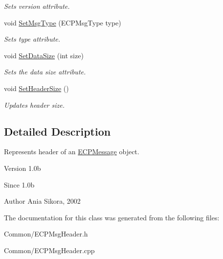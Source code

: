 \begin{DoxyCompactItemize}
\begin{DoxyCompactList}\small\item\em Sets version attribute. \end{DoxyCompactList}\item 
\hypertarget{class_common_1_1_e_c_p_msg_header_a9ac66458c65b4f049f70cae4aefbf6a0}{void \hyperlink{class_common_1_1_e_c_p_msg_header_a9ac66458c65b4f049f70cae4aefbf6a0}{Set\-Msg\-Type} (E\-C\-P\-Msg\-Type type)}\label{class_common_1_1_e_c_p_msg_header_a9ac66458c65b4f049f70cae4aefbf6a0}

\begin{DoxyCompactList}\small\item\em Sets type attribute. \end{DoxyCompactList}\item 
\hypertarget{class_common_1_1_e_c_p_msg_header_a799c73f11ac069ab79d42d03137bc341}{void \hyperlink{class_common_1_1_e_c_p_msg_header_a799c73f11ac069ab79d42d03137bc341}{Set\-Data\-Size} (int size)}\label{class_common_1_1_e_c_p_msg_header_a799c73f11ac069ab79d42d03137bc341}

\begin{DoxyCompactList}\small\item\em Sets the data size attribute. \end{DoxyCompactList}\item 
\hypertarget{class_common_1_1_e_c_p_msg_header_a11971a2c7551b939d5620969946f0169}{void \hyperlink{class_common_1_1_e_c_p_msg_header_a11971a2c7551b939d5620969946f0169}{Set\-Header\-Size} ()}\label{class_common_1_1_e_c_p_msg_header_a11971a2c7551b939d5620969946f0169}

\begin{DoxyCompactList}\small\item\em Updates header size. \end{DoxyCompactList}\end{DoxyCompactItemize}


\subsection{Detailed Description}
Represents header of an \hyperlink{class_common_1_1_e_c_p_message}{E\-C\-P\-Message} object. 

\begin{DoxyVersion}{Version}
1.\-0b 
\end{DoxyVersion}
\begin{DoxySince}{Since}
1.\-0b 
\end{DoxySince}
\begin{DoxyAuthor}{Author}
Ania Sikora, 2002 
\end{DoxyAuthor}


The documentation for this class was generated from the following files\-:\begin{DoxyCompactItemize}
\item 
Common/E\-C\-P\-Msg\-Header.\-h\item 
Common/E\-C\-P\-Msg\-Header.\-cpp\end{DoxyCompactItemize}

